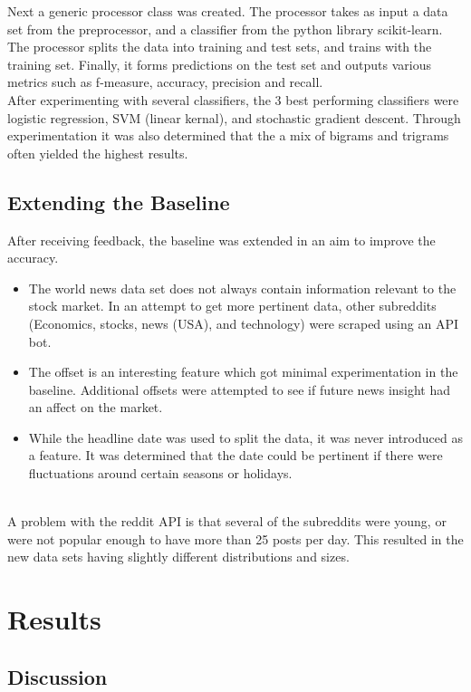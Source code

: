 \documentclass[11pt,a4paper]{article}
\begin{document}
Next a generic processor class was created. The processor takes as input a data set from the preprocessor, and a classifier from the python library scikit-learn. The processor splits the data into training and test sets, and trains with the training set. Finally, it forms predictions on the test set and outputs various metrics such as f-measure, accuracy, precision and recall.\\

After experimenting with several classifiers, the 3 best performing classifiers were logistic regression, SVM (linear kernal), and stochastic gradient descent. Through experimentation it was also determined that the a mix of bigrams and trigrams often yielded the highest results.

\subsection{Extending the Baseline}
After receiving feedback, the baseline was extended in an aim to improve the accuracy.
\begin{itemize}
\item The world news data set does not always contain information relevant to the stock market. In an attempt to get more pertinent data, other subreddits (Economics, stocks, news (USA), and technology) were scraped using an API bot.

\item The offset is an interesting feature which got minimal experimentation in the baseline. Additional offsets were attempted to see if future news insight had an affect on the market.

\item While the headline date was used to split the data, it was never introduced as a feature. It was determined that the date could be pertinent if there were fluctuations around certain seasons or holidays.
\end{itemize}\\

A problem with the reddit API is that several of the subreddits were young, or were not popular enough to have more than 25 posts per day. This resulted in the new data sets having slightly different distributions and sizes.\\


\section{Results}
\subsection{Discussion}
\end{document}
